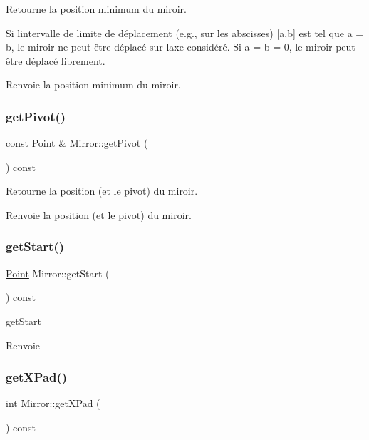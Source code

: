Retourne la position minimum du miroir. 

Si l\textquotesingle{}intervalle de limite de déplacement (e.\+g., sur les abscisses) \mbox{[}a,b\mbox{]} est tel que a = b, le miroir ne peut être déplacé sur l\textquotesingle{}axe considéré. Si a = b = 0, le miroir peut être déplacé librement. \begin{DoxyReturn}{Renvoie}
la position minimum du miroir. 
\end{DoxyReturn}
\mbox{\label{class_mirror_af419b1b2478e02211ff5b6369453a7ca}} 
\subsubsection{\texorpdfstring{getPivot()}{getPivot()}}
{\footnotesize\ttfamily const \mbox{\hyperlink{class_point}{Point}} \& Mirror\+::get\+Pivot (\begin{DoxyParamCaption}{ }\end{DoxyParamCaption}) const}

Retourne la position (et le pivot) du miroir. \begin{DoxyReturn}{Renvoie}
la position (et le pivot) du miroir. 
\end{DoxyReturn}
\mbox{\label{class_mirror_a960b9dfc0c04975b7b5812fd37d9bb61}} 
\subsubsection{\texorpdfstring{getStart()}{getStart()}}
{\footnotesize\ttfamily \mbox{\hyperlink{class_point}{Point}} Mirror\+::get\+Start (\begin{DoxyParamCaption}{ }\end{DoxyParamCaption}) const}



get\+Start 

\begin{DoxyReturn}{Renvoie}

\end{DoxyReturn}
\mbox{\label{class_mirror_a2cf5f8d8bff3cca5acd320addca8c220}} 
\subsubsection{\texorpdfstring{getXPad()}{getXPad()}}
{\footnotesize\ttfamily int Mirror\+::get\+X\+Pad (\begin{DoxyParamCaption}{ }\end{DoxyParamCaption}) const}

